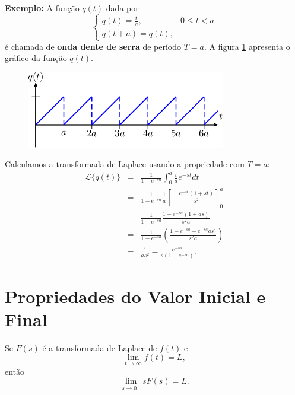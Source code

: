 \documentclass[a4paper,10pt]{book}
\begin{document}
{\bf Exemplo:} A função $q(t)$ dada por
 \begin{equation}
 \left\{\begin{array}{ll}q(t)=\frac{t}{a},&0\leq t<a\\ q\left(t+a\right)=q(t), & \end{array}\right.
 \end{equation}
 é chamada de {\bf onda dente de serra} de período $T=a$. A figura \ref{fig_dente_de_serra} apresenta o gráfico da função $q(t)$.
  \begin{figure}[!ht]
 \begin{center}
 \includegraphics{figs/especiais_figura_5}
 \end{center}
 \caption{\label{fig_dente_de_serra}}
 \end{figure}
 Calculamos a transformada de Laplace usando a propriedade  com $T=a$:
 \begin{eqnarray*}
 \mathcal{L}\{q(t)\}&=& \frac{1}{1-e^{-sa}} \int_0^{a} \frac{t}{a} e^{-st}dt\\
 &=&\frac{1}{1-e^{-sa}}\frac{1}{a}\left[ -\frac{e^{-s t} (1+s t)}{s^2}\right]_0^a\\
 &=&\frac{1}{1-e^{-sa}}\frac{1-e^{-sa}(1+as)}{s^2a} \\
 &=&\frac{1}{1-e^{-sa}}\left(\frac{1-e^{-sa}-e^{-sa} as)}{s^2a} \right)\\
 &=&\frac{1}{as^2}-\frac{e^{-sa} }{s\left(1-e^{-sa}\right)}.
 \end{eqnarray*}


 \section{Propriedades do Valor Inicial e Final}
 Se $F(s)$ é a transformada de Laplace de $f(t)$ e 
\begin{equation}
\lim_{t\to\infty}f(t)=L,
\end{equation}
então
\begin{equation}
\lim_{s\to 0^+} sF(s)=L.
\end{equation}
\end{document}
